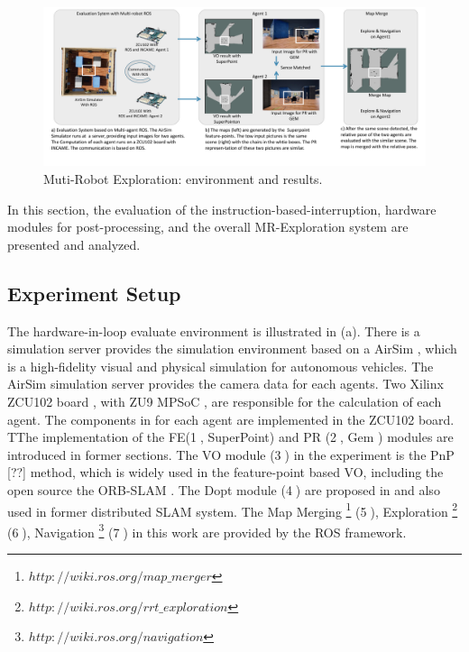\label{sec:experiments}


\begin{figure}[t]
  \centering
  \includegraphics[width=0.9\linewidth]{fig/env.pdf}
  \caption{Muti-Robot Exploration: environment and results. }
  \label{fig:env}
\end{figure}

In this section, the evaluation of the instruction-based-interruption, hardware modules for post-processing, and the overall MR-Exploration system are presented and analyzed.

\subsection{ Experiment Setup }

The hardware-in-loop evaluate environment is illustrated in (a). There is a simulation server provides the simulation environment based on a AirSim \cite{shah2018airsim}, which is a high-fidelity visual and physical simulation for autonomous vehicles. The AirSim simulation server provides the camera data for each agents. Two Xilinx ZCU102 board \cite{zcu102}, with ZU9 MPSoC \cite{MPSoC}, are responsible for the calculation of each agent. 
The components in  for each agent are implemented in the ZCU102 board. TThe implementation of the FE(\textcircled{1}, SuperPoint\cite{detone2018superpoint}) and PR (\textcircled{2}, Gem \cite{radenovic2018fine}) modules are introduced in former sections. 
The VO module (\textcircled{3}) in the experiment is the PnP [??] method, which is widely used in the feature-point based VO, including the open source the ORB-SLAM \cite{Mur-Artal:2017281}. 
The Dopt module (\textcircled{4}) are proposed in \cite{Choudhary:2017e66} and also used in former distributed SLAM system\cite{cieslewski2018data}. 
The Map Merging \footnote{$http://wiki.ros.org/map\_merger$} (\textcircled{5}), Exploration \footnote{$http://wiki.ros.org/rrt\_exploration$} (\textcircled{6}), Navigation \footnote{$http://wiki.ros.org/navigation$} (\textcircled{7}) in this work are provided by the ROS framework. 

